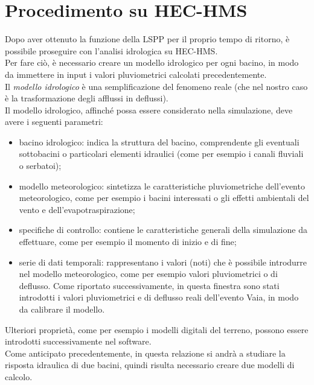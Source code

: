 \section{Procedimento su HEC-HMS}
Dopo aver ottenuto la funzione della LSPP per il proprio tempo di ritorno, è possibile proseguire con l'analisi idrologica su HEC-HMS.\\
Per fare ciò, è necessario creare un modello idrologico per ogni bacino, in modo da immettere in input i valori pluviometrici calcolati precedentemente.\\
Il \textit{modello idrologico} è una semplificazione del fenomeno reale (che nel nostro caso è la trasformazione degli afflussi in deflussi).\\
Il modello idrologico, affinché possa essere considerato nella simulazione, deve avere i seguenti parametri:
\begin{itemize}
    \item bacino idrologico: indica la struttura del bacino, comprendente gli eventuali sottobacini o particolari elementi idraulici (come per esempio i canali fluviali o serbatoi);
    \item modello meteorologico: sintetizza le caratteristiche pluviometriche dell'evento meteorologico, come per esempio i bacini interessati o gli effetti ambientali del vento e dell'evapotraspirazione;
    \item specifiche di controllo: contiene le caratteristiche generali della simulazione da effettuare, come per esempio il momento di inizio e di fine;
    \item serie di dati temporali: rappresentano i valori (noti) che è possibile introdurre nel modello meteorologico, come per esempio valori pluviometrici o di deflusso. Come riportato successivamente, in questa finestra sono stati introdotti i valori pluviometrici e di deflusso reali dell'evento Vaia, in modo da calibrare il modello.
\end{itemize}
 Ulteriori proprietà, come per esempio i modelli digitali del terreno, possono essere introdotti successivamente nel software.\\
 Come anticipato precedentemente, in questa relazione si andrà a studiare la risposta idraulica di due bacini, quindi risulta necessario creare due modelli di calcolo.

